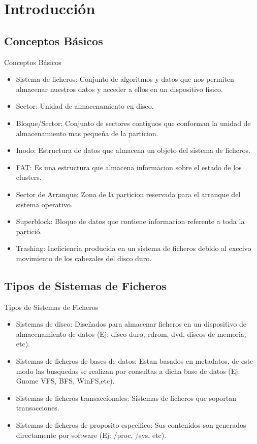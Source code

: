 \section{Introducción}
\subsection{Conceptos Básicos}
\begin{frame}{Conceptos Básicos}
  \begin{itemize}
    \item Sistema de ficheros: Conjunto de algoritmos y datos que nos permiten almacenar nuestros datos y acceder a ellos en un dispositivo fisico.
    \item Sector: Unidad de almacenamiento en disco.
    \item Bloque/Sector: Conjunto de sectores contiguos que conforman la unidad de almacenamiento mas pequeña de la particion.
    \item Inodo: Estructura de datos que almacena un objeto del sistema de ficheros.
    \item FAT: Es una estructura que almacena informacion sobre el estado de los clusters.
    \item Sector de Arranque: Zona de la particion reservada para el arranque del sistema operativo.
    \item Superblock: Bloque de datos que contiene informacion referente a toda la partició.
    \item Trashing: Ineficiencia producida en un sistema de ficheros debido al execivo movimiento de los cabezales del disco duro.
  \end{itemize}
\end{frame}

\subsection{Tipos de Sistemas de Ficheros}
\begin{frame}{Tipos de Sistemas de Ficheros}
  \begin{itemize}
    \item Sistemas de disco: Diseñados para almacenar ficheros en un dispositivo de almacenamiento de datos (Ej: disco duro, cdrom, dvd, discos de memoria, etc).
    \item Sistemas de ficheros de bases de datos: Estan basados en metadatos, de este modo las busquedas se realizan por consultas a dicha base de datos (Ej: Gnome VFS, BFS, WinFS,etc).
    \item Sistemas de ficheros transaccionales: Sistemas de ficheros que soportan transacciones.
    \item Sistemas de ficheros de proposito especifico: Sus contenidos son generados directamente por software (Ej: /proc, /sys, etc).
  \end{itemize}
\end{frame}
